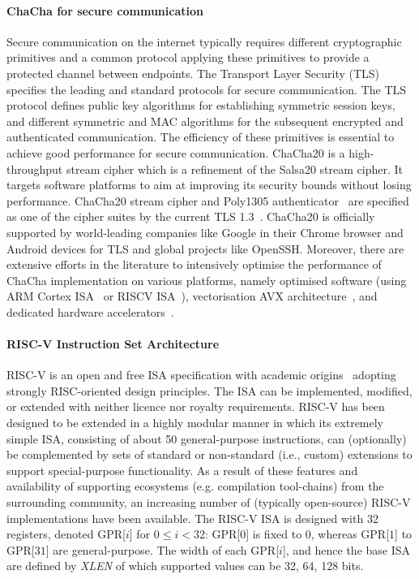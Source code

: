\paragraph{ChaCha for secure communication}
Secure communication on the internet typically requires different cryptographic primitives and a common protocol applying these primitives to provide a protected channel between endpoints.
The Transport Layer Security (TLS) specifies the leading and standard protocols for secure communication.
The TLS protocol defines public key algorithms for establishing symmetric session keys, and different symmetric and MAC algorithms for the subsequent encrypted and authenticated communication.
The efficiency of these primitives is essential to achieve good performance for secure communication.
ChaCha20 is a high-throughput stream cipher which is a refinement of the Salsa20 stream cipher. It targets software platforms to aim at improving its security bounds without losing performance. ChaCha20 stream cipher and Poly1305 authenticator~\cite{RFC:16} are specified as one of the cipher suites by the current TLS 1.3~\cite[Section 9.1]{RFC:18:8446}.
ChaCha20 is officially supported by world-leading companies like Google in their Chrome browser and Android devices for TLS and global projects like OpenSSH.
Moreover, there are extensive efforts in the literature to intensively optimise the performance of ChaCha implementation on various platforms, namely optimised software (using ARM Cortex ISA~\cite{SSS:17} or RISCV ISA~\cite{Sto:19}), vectorisation AVX architecture~\cite{GolGue:14}, and dedicated hardware accelerators~\cite{KLA:19,PRH:19}.  

\paragraph{RISC-V Instruction Set Architecture}
RISC-V is an open and free ISA specification with academic origins~\cite{riscv:14} adopting strongly RISC-oriented design principles. 
The ISA can be implemented, modified, or extended with neither licence nor royalty requirements.
RISC-V has been designed to be extended in a highly modular manner 
in which its extremely simple ISA, consisting of about 50 general-purpose instructions, can (optionally) be complemented by sets of
standard or non-standard (i.e., custom) extensions to support special-purpose functionality.
As a result of these features and availability of supporting ecosystems (e.g. compilation tool-chains) from the surrounding community,
an increasing number of (typically open-source) RISC-V implementations have been available.
The RISC-V ISA is designed with 32 registers, denoted GPR[$i$] for $0 \le i < 32$: GPR[$0$] is fixed to 0, whereas GPR[$1$] to GPR[$31$] are general-purpose. 
The width of each GPR[$i$], and hence the base ISA are defined by \emph{XLEN} of which supported values can be 32, 64, 128 bits. 


